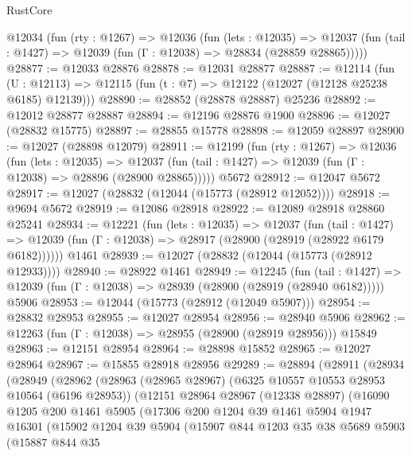 \begin{lexlean}{RustCore}
\begin{coremodule}
  @12034
    (fun (rty : @1267) =>
    @12036
      (fun (lets : @12035) =>
      @12037 (fun (tail : @1427) => @12039 (fun (Γ : @12038) => @28834 (@28859 @28865)))))
@28877 := @12033 @28876
@28878 := @12031 @28877
@28887 := @12114
    (fun (U : @12113) => @12115 (fun (t : @7) => @12122 (@12027 (@12128 @25238 @6185) @12139)))
@28890 := @28852 (@28878 @28887) @25236
@28892 := @12012 @28877 @28887
@28894 := @12196 @28876 @1900
@28896 := @12027 (@28832 @15775)
@28897 := @28855 @15778
@28898 := @12059 @28897
@28900 := @12027 (@28898 @12079)
@28911 := @12199
    (fun (rty : @1267) =>
    @12036
      (fun (lets : @12035) =>
      @12037 (fun (tail : @1427) => @12039 (fun (Γ : @12038) => @28896 (@28900 @28865)))))
    @5672
@28912 := @12047 @5672
@28917 := @12027 (@28832 (@12044 (@15773 (@28912 @12052))))
@28918 := @9694 @5672
@28919 := @12086 @28918
@28922 := @12089 @28918 @28860 @25241
@28934 := @12221
    (fun (lets : @12035) =>
    @12037
      (fun (tail : @1427) =>
      @12039 (fun (Γ : @12038) => @28917 (@28900 (@28919 (@28922 @6179 @6182))))))
    @1461
@28939 := @12027 (@28832 (@12044 (@15773 (@28912 @12933))))
@28940 := @28922 @1461
@28949 := @12245
    (fun (tail : @1427) => @12039 (fun (Γ : @12038) => @28939 (@28900 (@28919 (@28940 @6182)))))
    @5906
@28953 := @12044 (@15773 (@28912 (@12049 @5907)))
@28954 := @28832 @28953
@28955 := @12027 @28954
@28956 := @28940 @5906
@28962 := @12263 (fun (Γ : @12038) => @28955 (@28900 (@28919 @28956))) @15849
@28963 := @12151 @28954
@28964 := @28898 @15852
@28965 := @12027 @28964
@28967 := @15855 @28918 @28956
@29289 := @28894
    (@28911
      (@28934
        (@28949
          (@28962
            (@28963
              (@28965 @28967)
              (@6325 @10557 @10553 @28953 @10564 (@6196 @28953))
              (@12151
                @28964
                @28967
                (@12338 @28897)
                (@16090
                  @1205
                  @200
                  @1461
                  @5905
                  (@17306
                    @200
                    @1204
                    @39
                    @1461
                    @5904
                    @1947
                    @16301
                    (@15902
                      @1204
                      @39
                      @5904
                      (@15907
                        @844
                        @1203
                        @35
                        @38
                        @5689
                        @5903
                        (@15887
                          @844
                          @35

\end{coremodule}
\end{lexlean}
